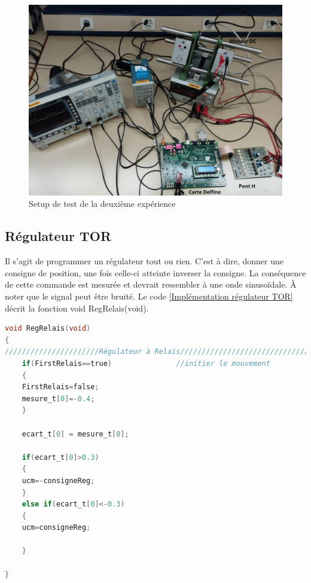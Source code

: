 \begin{figure}[h]
	\centering
	\includegraphics[width=0.99\linewidth]{img/Setup}
	\caption{Setup de test de la deuxième expérience}
	\label{fig:Setup de test de la deuxième expérience}
\end{figure}

\newpage

\subsection{Régulateur TOR}  
Il s'agit de programmer un régulateur tout ou rien. C'est à dire, donner une consigne de position, une fois celle-ci atteinte inverser la consigne. La conséquence de cette commande est mesurée et devrait ressembler à une onde sinusoïdale. \`A noter que le signal peut être bruité. Le code \ref{Implémentation régulateur TOR} décrit la fonction void RegRelais(void).

\begin{lstlisting}[language=C,caption={Implémentation Régulateur TOR}, label={Implémentation régulateur TOR}]
void RegRelais(void)
{
//////////////////////Régulateur à Relais/////////////////////////////////
	if(FirstRelais==true)               //initier le mouvement
	{
	FirstRelais=false;
	mesure_t[0]=-0.4;
	}

	ecart_t[0] = mesure_t[0];

	if(ecart_t[0]>0.3)
	{
	ucm=-consigneReg;
	}
	else if(ecart_t[0]<-0.3)
	{
	ucm=consigneReg;
	
	}

}

\end{lstlisting}

